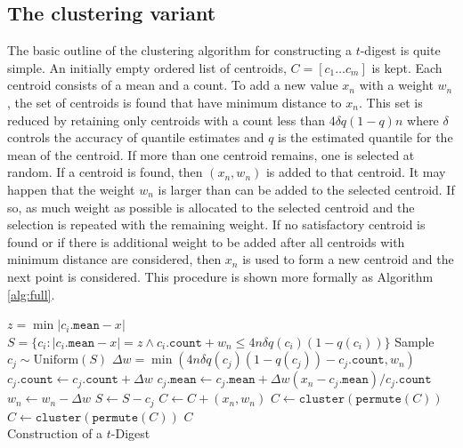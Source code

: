 \documentclass[11pt]{amsart}
\begin{document}
\subsection{The clustering variant}


The basic outline of the clustering algorithm for constructing a $t$-digest is quite simple.  An initially empty ordered list of centroids, $C = [ c_1 \ldots c_m ]$ is kept.  Each centroid consists of a mean and a count.  To add a new value $x_n$ with a weight $w_n$, the set of centroids is found that have minimum distance to $x_n$.  This set is reduced by retaining only centroids with a count less than $4\delta q (1-q) n $ where $\delta$ controls the accuracy of quantile estimates and $q$ is the estimated quantile for the mean of the centroid.  If more than one centroid remains, one is selected at random.  If a centroid is found, then $(x_n,w_n)$ is added to that centroid.  It may happen that the weight $w_n$ is larger than can be added to the selected centroid.  If so, as much weight as possible is allocated to the selected centroid and the selection is repeated with the remaining weight.  If no satisfactory centroid is found or if there is additional weight to be added after all centroids with minimum distance are considered, then $x_n$ is used to form a new centroid and the next point is considered.  This procedure is shown more formally as Algorithm \ref{alg:full}.
 \begin{algorithm}[tb]
 \label{alg:full}
\SetNoFillComment
{}
 {
  $z = \min | c_i.\mathtt{mean} - x |$\;
  $S = \lbrace c_i  :  |c_i.\mathtt{mean} - x| = z \wedge c_i.\mathtt{count} + w_n \le 4n\delta q(c_i) (1-q(c_i)) \rbrace $\;
    {
       Sample $c_j \sim \mathrm{Uniform}( S)$\;
       $\Delta w = \min(4n\delta q(c_j) (1-q(c_j))-c_j.\mathtt{count}, w_n)$\;
       $c_j.\mathtt{count} \gets c_j.\mathtt{count} + \Delta w$\;
       $c_j.\mathtt{mean} \gets c_j.\mathtt{mean} + \Delta w (x_n - c_j.\mathtt{mean})/c_j.\mathtt{count}$\;
       $w_n \gets w_n - \Delta w$\;
       $S \gets S - c_j$
     } 
      {
        $C \gets C + (x_n, w_n)$\;
      }
       {
         $C \gets \mathtt{cluster}(\mathtt{permute}( C )) $\;
       }
} 
$C \gets \mathtt{cluster}(\mathtt{permute}( C )) $\;
\Return $ C $\\
\caption{Construction of a $t$-Digest}
\end{algorithm}
\end{document}
